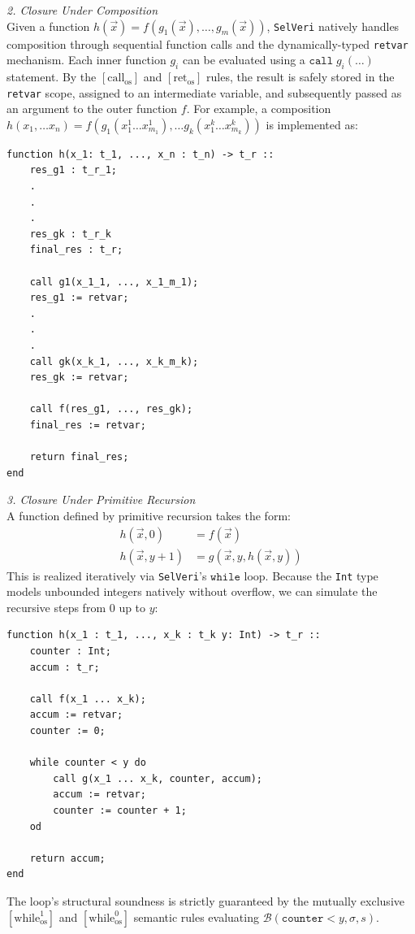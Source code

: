 \documentclass{article}
\begin{document}
\newpage
\textit{2. Closure Under Composition} \\
Given a function $h(\vec{x}) = f(g_1(\vec{x}), \dots, g_m(\vec{x}))$, \texttt{SelVeri} natively handles composition through sequential function calls and the dynamically-typed \texttt{retvar} mechanism. Each inner function $g_i$ can be evaluated using a $\mathtt{call}\; g_i(\dots)$ statement. By the $[\text{call}_{\text{os}}]$ and $[\text{ret}_{\text{os}}]$ rules, the result is safely stored in the \texttt{retvar} scope, assigned to an intermediate variable, and subsequently passed as an argument to the outer function $f$. For example, a composition $h(x_1, \dots x_n) = f(g_1(x^1_1 \dots x_{m_1}^1), \dots g_k(x^k_1 \dots x_{m_k}^k))$ is implemented as:
\begin{verbatim}
function h(x_1: t_1, ..., x_n : t_n) -> t_r ::
    res_g1 : t_r_1;
    .
    .
    .
    res_gk : t_r_k
    final_res : t_r;
    
    call g1(x_1_1, ..., x_1_m_1);
    res_g1 := retvar;
    .
    .
    .
    call gk(x_k_1, ..., x_k_m_k);
    res_gk := retvar;
    
    call f(res_g1, ..., res_gk);
    final_res := retvar;
    
    return final_res;
end
\end{verbatim}

\newpage
\textit{3. Closure Under Primitive Recursion} \\
A function defined by primitive recursion takes the form:
\begin{align*}
h(\vec{x}, 0) &= f(\vec{x}) \\
h(\vec{x}, y+1) &= g(\vec{x}, y, h(\vec{x}, y))
\end{align*}
This is realized iteratively via \texttt{SelVeri}'s $\mathtt{while}$ loop. Because the \texttt{Int} type models unbounded integers natively without overflow, we can simulate the recursive steps from $0$ up to $y$:
\begin{verbatim}
function h(x_1 : t_1, ..., x_k : t_k y: Int) -> t_r ::
    counter : Int;
    accum : t_r;
    
    call f(x_1 ... x_k);
    accum := retvar;
    counter := 0;
    
    while counter < y do
        call g(x_1 ... x_k, counter, accum);
        accum := retvar;
        counter := counter + 1;
    od
    
    return accum;
end
\end{verbatim}

The loop's structural soundness is strictly guaranteed by the mutually exclusive $[\text{while}^1_{\text{os}}]$ and $[\text{while}^0_{\text{os}}]$ semantic rules evaluating $\mathcal{B}(\mathtt{counter} < y, \sigma, s)$. \\
\end{document}
